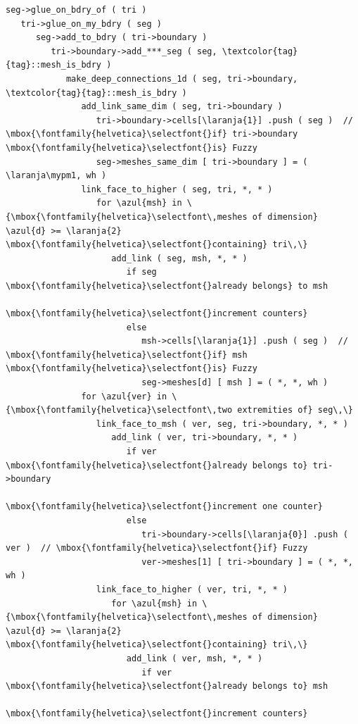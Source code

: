 \def\mypm{$\pm$}
\begin{Verbatim}[commandchars=\\\{\},formatcom=\small\tt,baselinestretch=0.94]
seg->glue_on_bdry_of ( tri )
   tri->glue_on_my_bdry ( seg )
      seg->add_to_bdry ( tri->boundary )
         tri->boundary->add_***_seg ( seg, \textcolor{tag}{tag}::mesh_is_bdry )
            make_deep_connections_1d ( seg, tri->boundary, \textcolor{tag}{tag}::mesh_is_bdry )
               add_link_same_dim ( seg, tri->boundary )
                  tri->boundary->cells[\laranja{1}] .push ( seg )  // \mbox{\fontfamily{helvetica}\selectfont{}if} tri->boundary \mbox{\fontfamily{helvetica}\selectfont{}is} Fuzzy
                  seg->meshes_same_dim [ tri->boundary ] = ( \laranja\mypm1, wh )
               link_face_to_higher ( seg, tri, *, * )
                  for \azul{msh} in \{\mbox{\fontfamily{helvetica}\selectfont\,meshes of dimension} \azul{d} >= \laranja{2} \mbox{\fontfamily{helvetica}\selectfont{}containing} tri\,\}
                     add_link ( seg, msh, *, * )
                        if seg \mbox{\fontfamily{helvetica}\selectfont{}already belongs} to msh
                           \mbox{\fontfamily{helvetica}\selectfont{}increment counters}
                        else
                           msh->cells[\laranja{1}] .push ( seg )  // \mbox{\fontfamily{helvetica}\selectfont{}if} msh \mbox{\fontfamily{helvetica}\selectfont{}is} Fuzzy
                           seg->meshes[d] [ msh ] = ( *, *, wh )
               for \azul{ver} in \{\mbox{\fontfamily{helvetica}\selectfont\,two extremities of} seg\,\}
                  link_face_to_msh ( ver, seg, tri->boundary, *, * )
                     add_link ( ver, tri->boundary, *, * )
                        if ver \mbox{\fontfamily{helvetica}\selectfont{}already belongs to} tri->boundary
                           \mbox{\fontfamily{helvetica}\selectfont{}increment one counter}
                        else
                           tri->boundary->cells[\laranja{0}] .push ( ver )  // \mbox{\fontfamily{helvetica}\selectfont{}if} Fuzzy
                           ver->meshes[1] [ tri->boundary ] = ( *, *, wh )
                  link_face_to_higher ( ver, tri, *, * )
                     for \azul{msh} in \{\mbox{\fontfamily{helvetica}\selectfont\,meshes of dimension} \azul{d} >= \laranja{2} \mbox{\fontfamily{helvetica}\selectfont{}containing} tri\,\}
                        add_link ( ver, msh, *, * )
                           if ver \mbox{\fontfamily{helvetica}\selectfont{}already belongs to} msh
                              \mbox{\fontfamily{helvetica}\selectfont{}increment counters}

\end{Verbatim}
